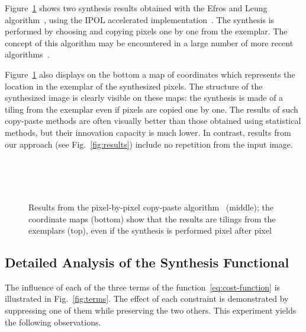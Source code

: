 Figure~\ref{fig:efros} shows two synthesis results obtained with the Efros and Leung algorithm~\cite{efros1999texture}, using the IPOL accelerated implementation~\cite{aguerrebere2013exemplar}.
The synthesis is performed by choosing and copying pixels one by one from the exemplar.
The concept of this algorithm may be encountered in a large number of more recent algorithms~\cite{Wei2009}.

Figure~\ref{fig:efros} also displays on the bottom a map of coordinates which represents the location in the exemplar of the synthesized pixels.
The structure of the synthesized image is clearly visible on these maps: the synthesis is made of a tiling from the exemplar even if pixels are copied one by one.
The results of such copy-paste methods are often visually better than those obtained using statistical methods, but their innovation capacity is much lower.
In contrast, results from our approach (see Fig.~\ref{fig:results}) include no repetition from the input image.

\begin{figure}
  \centering
  \hspace{4.5em}
  \\ \vspace{1mm}
  \\
  \\
  \caption[Comparison with a copy-paste method]{
    Results from the pixel-by-pixel copy-paste algorithm~\cite{efros1999texture} (middle);
    the coordinate maps (bottom) show that the results are tilings from the exemplars (top), even if the synthesis is performed pixel after pixel
  }
  \label{fig:efros}
\end{figure}


\subsection{Detailed Analysis of the Synthesis Functional}

The influence of each of the three terms of the function~\eqref{eq:cost-function} is illustrated in Fig.~\ref{fig:terms}.
The effect of each constraint is demonstrated by suppressing one of them while preserving the two others.
This experiment yields the following observations.

